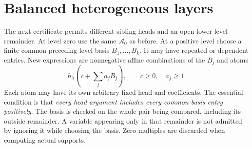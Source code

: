 \documentclass[11pt]{article}
\begin{document}
\section{Balanced heterogeneous layers}
The next certificate permits different sibling heads and an open lower-level
remainder. At level zero use the same $\mathcal A_0$ as before. At a
positive level choose a finite common preceding-level basis
$B_1,\ldots,B_k$. It may have repeated or dependent entries. New expressions
are nonnegative affine combinations of the $B_j$ and atoms
\begin{equation}\label{eq:balanced-atoms}
 h_\lambda\!\left(c+\sum_j a_jB_j\right),
       \qquad c\ge0,\quad a_j\ge1.
\end{equation}
Each atom may have its own arbitrary fixed head and coefficients. The
essential condition is that \emph{every head argument includes every
common basis entry positively}. The basis is checked on the whole pair
being compared, including its outside remainder. A variable appearing
only in that remainder is not admitted by ignoring it while choosing the
basis. Zero multiples are discarded when computing actual supports.
\end{document}
